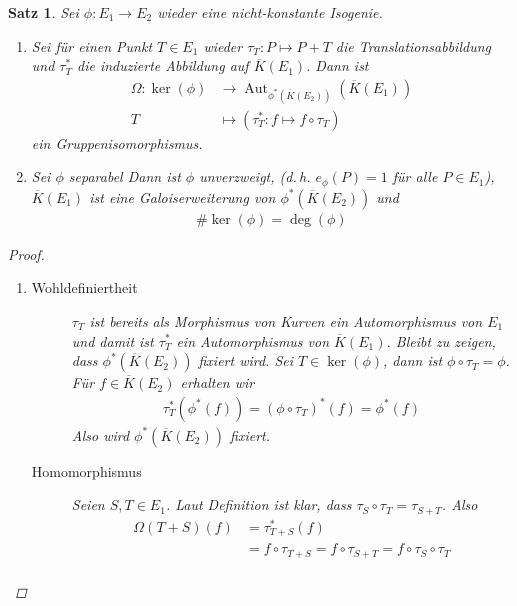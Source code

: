 \documentclass[english, german, parskip=half]{scrartcl}
\newtheorem{Satz}{Satz}[section]
\theoremstyle{definition}
\theoremstyle{remark}
\newcommand*{\algK}{\ensuremath{\overline K}} %
\newcommand*{\longto}{\longrightarrow}
\DeclareMathOperator{\Aut}{Aut} %
\begin{document}
\begin{Satz}\label{galois}
  Sei $\phi\colon E_1\to E_2$ wieder eine nicht-konstante Isogenie.
  \begin{enumerate}[label=\roman*)]
  \item Sei für einen Punkt $T\in E_1$ wieder 
    $\tau_T\colon P\mapsto P+T$ die Translationsabbildung und 
    $\tau_T^*$ die induzierte Abbildung auf $\algK(E_1)$.
    Dann ist
    \begin{align*}
      \Omega\colon
      \ker(\phi) 
      &\longto \Aut_{\phi^*(\algK(E_2))}\left( \algK(E_1) \right) \\
      T 
      &\longmapsto \left( \tau_T^* \colon f\mapsto f\circ \tau_T \right)
    \end{align*}
    ein Gruppenisomorphismus.
  \item Sei $\phi$ separabel 
    Dann ist $\phi$ unverzweigt,
    (d.\,h. $e_\phi(P)=1$ für alle $P\in E_1$),
    $\algK(E_1)$ ist eine Galoiserweiterung von $\phi^*(\algK(E_2))$
    und
    \begin{gather*}
      \#\ker(\phi) = \deg(\phi)
    \end{gather*}
\end{enumerate}
\begin{proof}~
  \begin{enumerate}[label=\roman*)]
  \item 
    \begin{description}
        \item[Wohldefiniertheit] $\tau_T$ ist bereits als Morphismus
          von Kurven ein Automorphismus von $E_1$ und damit ist
          $\tau_T^*$ ein Automorphismus von $\algK(E_1)$. Bleibt zu
          zeigen, dass $\phi^*(\algK(E_2))$ fixiert wird.
          Sei $T\in\ker(\phi)$, dann ist $\phi\circ\tau_T=\phi$.
          Für $f\in\algK(E_2)$ erhalten wir
          \begin{gather*}
            \tau_T^*(\phi^*(f)) = (\phi\circ\tau_T)^*(f) = \phi^*(f)
          \end{gather*}
          Also wird $\phi^*(\algK(E_2))$ fixiert.
        \item[Homomorphismus] Seien $S,T\in E_1$. Laut Definition ist
          klar, dass $\tau_S\circ\tau_T = \tau_{S+T}$. Also
          \begin{align*}
            \Omega(T+S)(f)
            &= \tau^*_{T+S}(f)\\
            &= f\circ\tau_{T+S} 
            = f\circ\tau_{S+T}
            = f\circ\tau_{S}\circ\tau_{T}\\

\end{align*}
\end{description}
\end{enumerate}
\end{proof}
\end{Satz}
\end{document}
